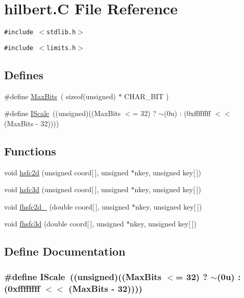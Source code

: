 \hypertarget{hilbert_8C}{
\section{hilbert.C File Reference}
\label{hilbert_8C}
}
{\tt \#include $<$stdlib.h$>$}\par
{\tt \#include $<$limits.h$>$}\par
\subsection*{Defines}
\begin{CompactItemize}
\item 
\#define \hyperlink{hilbert_8C_a0}{Max\-Bits}\ ( sizeof(unsigned) $\ast$ CHAR\_\-BIT )
\item 
\#define \hyperlink{hilbert_8C_a1}{IScale}\ ((unsigned)((Max\-Bits $<$= 32) ? $\sim$(0u) : (0xffffffff $<$$<$ (Max\-Bits - 32))))
\end{CompactItemize}
\subsection*{Functions}
\begin{CompactItemize}
\item 
void \hyperlink{hilbert_8C_a2}{hsfc2d} (unsigned coord\mbox{[}$\,$\mbox{]}, unsigned $\ast$nkey, unsigned key\mbox{[}$\,$\mbox{]})
\item 
void \hyperlink{hilbert_8C_a3}{hsfc3d} (unsigned coord\mbox{[}$\,$\mbox{]}, unsigned $\ast$nkey, unsigned key\mbox{[}$\,$\mbox{]})
\item 
void \hyperlink{hilbert_8C_a4}{fhsfc2d\_\-} (double coord\mbox{[}$\,$\mbox{]}, unsigned $\ast$nkey, unsigned key\mbox{[}$\,$\mbox{]})
\item 
void \hyperlink{hilbert_8C_a5}{fhsfc3d} (double coord\mbox{[}$\,$\mbox{]}, unsigned $\ast$nkey, unsigned key\mbox{[}$\,$\mbox{]})
\end{CompactItemize}


\subsection{Define Documentation}
\hypertarget{hilbert_8C_a1}{
\subsubsection[IScale]{\setlength{\rightskip}{0pt plus 5cm}\#define IScale\ ((unsigned)((Max\-Bits $<$= 32) ? $\sim$(0u) : (0xffffffff $<$$<$ (Max\-Bits - 32))))}}
\label{hilbert_8C_a1}


